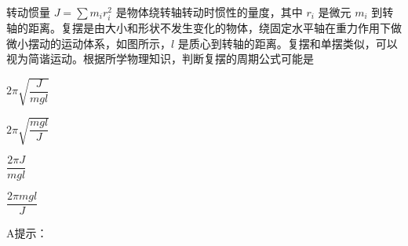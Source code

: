转动惯量 \(J = \sum m_i r_i^2\) 是物体绕转轴转动时惯性的量度，其中 \(r_i\) 是微元 \(m_i\) 到转轴的距离。复摆是由大小和形状不发生变化的物体，绕固定水平轴在重力作用下做微小摆动的运动体系，如图所示，\(l\) 是质心到转轴的距离。复摆和单摆类似，可以视为简谐运动。根据所学物理知识，判断复摆的周期公式可能是\paren[]
\begin{choices}
	\item \(2\pi \sqrt{\dfrac{J}{m g l}}\)
	\item \(2\pi \sqrt{\dfrac{m g l}{J}}\)
	\item \(\dfrac{2\pi J}{m g l}\)
	\item \(\dfrac{2\pi m g l}{J}\)
\end{choices}
\begin{answer}
    A\qquad 提示：
\end{answer}